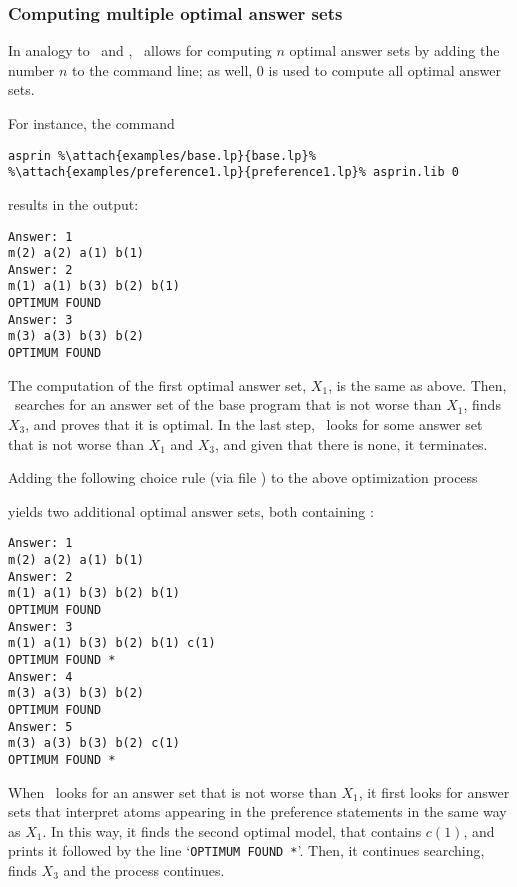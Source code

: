 \subsubsection{Computing multiple optimal answer sets}

In analogy to \clasp\ and \clingo, 
\asprin\ allows for computing $n$ optimal answer sets by adding the number $n$ to the command line;
as well, $0$ is used to compute all optimal answer sets. 

\begin{example}
For instance, the command
%
\begin{lstlisting}[numbers=none,escapechar=\%]
asprin %\attach{examples/base.lp}{base.lp}% %\attach{examples/preference1.lp}{preference1.lp}% asprin.lib 0
\end{lstlisting}
%
results in the output:
%
\begin{lstlisting}[numbers=none]
Answer: 1
m(2) a(2) a(1) b(1)
Answer: 2
m(1) a(1) b(3) b(2) b(1)
OPTIMUM FOUND
Answer: 3
m(3) a(3) b(3) b(2)
OPTIMUM FOUND
\end{lstlisting}
%
The computation of the first optimal answer set, $X_1$, is the same as above.
Then, \asprin\ searches for an answer set of the base program that is not worse than $X_1$, 
finds $X_3$, and proves that it is optimal. 
In the last step, \asprin\ looks for some answer set that is not worse than $X_1$ and $X_3$,  
and given that there is none, it terminates. 

Adding the following choice rule 
(via file )
to the above optimization process
%

%
yields two additional optimal answer sets, both containing : 
%
%
\begin{lstlisting}[numbers=none]
Answer: 1
m(2) a(2) a(1) b(1)
Answer: 2
m(1) a(1) b(3) b(2) b(1)
OPTIMUM FOUND
Answer: 3
m(1) a(1) b(3) b(2) b(1) c(1)
OPTIMUM FOUND *
Answer: 4
m(3) a(3) b(3) b(2)
OPTIMUM FOUND
Answer: 5
m(3) a(3) b(3) b(2) c(1)
OPTIMUM FOUND *
\end{lstlisting}
%
When \asprin\ looks for an answer set that is not worse than $X_1$,  
it first looks for answer sets that interpret atoms appearing in the preference statements
in the same way as $X_1$. 
In this way,
it finds the second optimal model, that contains $c(1)$, 
and prints it followed by the line `\lstinline{OPTIMUM FOUND *}'.  
Then, it continues searching, finds $X_3$ and the process continues. 


\end{example}
